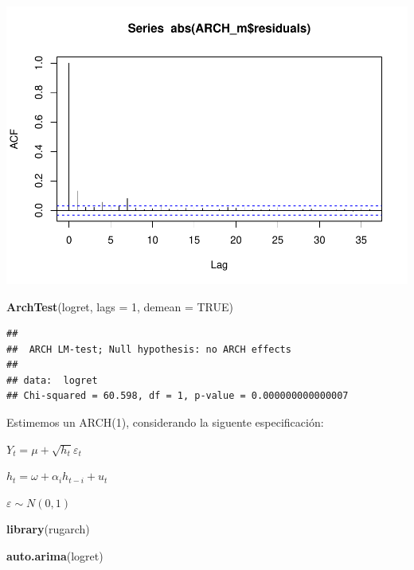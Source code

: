 \documentclass[
]{book}
\newenvironment{Shaded}{\begin{snugshade}}{\end{snugshade}}
\newcommand{\AttributeTok}[1]{\textcolor[rgb]{0.13,0.29,0.53}{#1}}
\newcommand{\ConstantTok}[1]{\textcolor[rgb]{0.56,0.35,0.01}{#1}}
\newcommand{\DecValTok}[1]{\textcolor[rgb]{0.00,0.00,0.81}{#1}}
\newcommand{\FunctionTok}[1]{\textcolor[rgb]{0.13,0.29,0.53}{\textbf{#1}}}
\newcommand{\NormalTok}[1]{#1}
\newcommand{\SpecialCharTok}[1]{\textcolor[rgb]{0.81,0.36,0.00}{\textbf{#1}}}
\begin{document}
\begin{Shaded}
\end{Shaded}

\includegraphics{Notas-Series-Tiempo_files/figure-latex/ArchTest-2.pdf}

\begin{Shaded}
\begin{Highlighting}[]
\FunctionTok{ArchTest}\NormalTok{(logret, }\AttributeTok{lags =} \DecValTok{1}\NormalTok{, }\AttributeTok{demean =} \ConstantTok{TRUE}\NormalTok{)}
\end{Highlighting}
\end{Shaded}

\begin{verbatim}
## 
##  ARCH LM-test; Null hypothesis: no ARCH effects
## 
## data:  logret
## Chi-squared = 60.598, df = 1, p-value = 0.000000000000007
\end{verbatim}

Estimemos un ARCH(1), considerando la siguente especificación:

\(Y_t = \mu+\sqrt{h_t}\varepsilon_t\)

\(h_t = \omega+\alpha_ih_{t-i}+u_t\)

\(\varepsilon \sim N(0,1)\)

\begin{Shaded}
\begin{Highlighting}[]
\FunctionTok{library}\NormalTok{(rugarch)}

\FunctionTok{auto.arima}\NormalTok{(logret)}
\end{Highlighting}
\end{Shaded}
\end{document}
